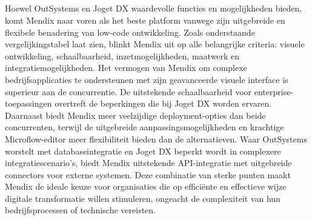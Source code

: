 \newpage

\subsection{}
Hoewel OutSystems en Joget DX waardevolle functies en mogelijkheden bieden, komt Mendix naar voren als het beste platform vanwege zijn uitgebreide en flexibele benadering van low-code ontwikkeling. Zoals onderstaande vergelijkingstabel laat zien, blinkt Mendix uit op alle belangrijke criteria: visuele ontwikkeling, schaalbaarheid, inzetmogelijkheden, maatwerk en integratiemogelijkheden.
Het vermogen van Mendix om complexe bedrijfsapplicaties te ondersteunen met zijn geavanceerde visuele interface is superieur aan de concurrentie. De uitstekende schaalbaarheid voor enterprise-toepassingen overtreft de beperkingen die bij Joget DX worden ervaren. Daarnaast biedt Mendix meer veelzijdige deployment-opties dan beide concurrenten, terwijl de uitgebreide aanpassingsmogelijkheden en krachtige Microflow-editor meer flexibiliteit bieden dan de alternatieven.
Waar OutSystems worstelt met databaseintegratie en Joget DX beperkt wordt in complexere integratiescenario's, biedt Mendix uitstekende \gls{API}-integratie met uitgebreide connectors voor externe systemen. Deze combinatie van sterke punten maakt Mendix de ideale keuze voor organisaties die op efficiënte en effectieve wijze digitale transformatie willen stimuleren, ongeacht de complexiteit van hun bedrijfsprocessen of technische vereisten.

\newpage

